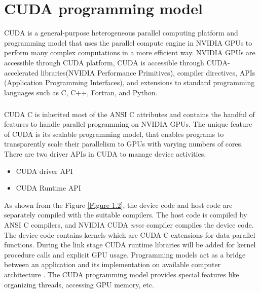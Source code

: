 %
\chapter{CUDA programming model}
CUDA is a general-purpose heterogeneous parallel computing platform and programming model that uses the parallel compute engine in NVIDIA GPUs to perform many complex computations in a more efficient way. NVIDIA GPUs are accessible through CUDA platform, CUDA is accessible through CUDA-accelerated libraries(NVIDIA Performance Primitives), compiler directives, APIs (Application Programming Interfaces), and extensions to standard programming languages such as C, C++, Fortran, and Python.
\paragraph*{} CUDA C is inherited most of the ANSI C attributes and contains the handful of features to handle parallel programming on NVIDIA GPUs. The unique feature of CUDA is its scalable programming model, that enables programs to transparently scale their parallelism to GPUs with varying numbers of cores. There are two driver APIs in CUDA to manage device activities.
\begin{itemize} 
\item CUDA driver API
\item CUDA Runtime API
\end{itemize}
As shown from the Figure \ref{Figure 1.2}, the device code and host code are separately compiled with the suitable compilers. The host code is compiled by ANSI C compilers, and NVIDIA CUDA \textit{nvcc} compiler compiles the device code. The device code contains kernels which are CUDA C extensions for data parallel functions. During the link stage CUDA runtime libraries will be added for kernel procedure calls and explicit GPU usage. Programming models act as a bridge between an application and its implementation on available computer architecture . The CUDA programming model provides special features like organizing threads, accessing GPU memory, etc.


